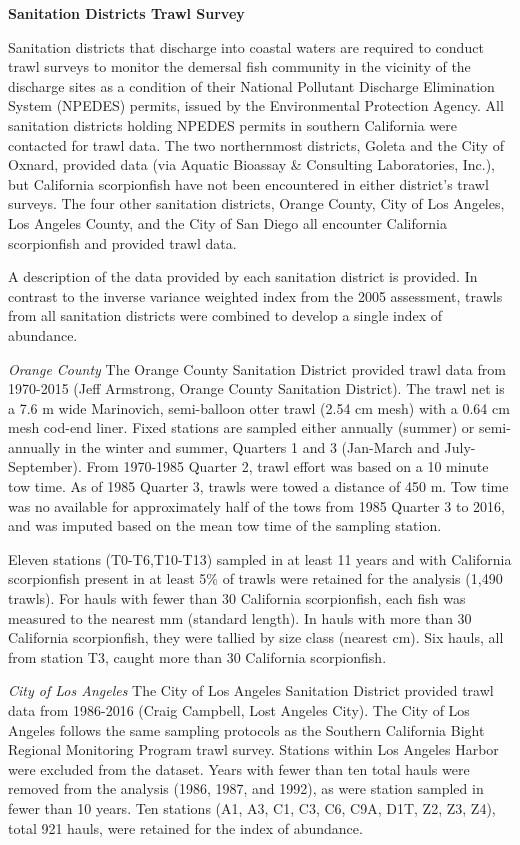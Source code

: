 \documentclass[12pt,]{article}
\begin{document}
\textbf{Sanitation Districts Trawl Survey}

Sanitation districts that discharge into coastal waters are required to
conduct trawl surveys to monitor the demersal fish community in the
vicinity of the discharge sites as a condition of their National
Pollutant Discharge Elimination System (NPEDES) permits, issued by the
Environmental Protection Agency. All sanitation districts holding NPEDES
permits in southern California were contacted for trawl data. The two
northernmost districts, Goleta and the City of Oxnard, provided data
(via Aquatic Bioassay \& Consulting Laboratories, Inc.), but California
scorpionfish have not been encountered in either district's trawl
surveys. The four other sanitation districts, Orange County, City of Los
Angeles, Los Angeles County, and the City of San Diego all encounter
California scorpionfish and provided trawl data.

A description of the data provided by each sanitation district is
provided. In contrast to the inverse variance weighted index from the
2005 assessment, trawls from all sanitation districts were combined to
develop a single index of abundance.

\emph{Orange County} The Orange County Sanitation District provided
trawl data from 1970-2015 (Jeff Armstrong, Orange County Sanitation
District). The trawl net is a 7.6 m wide Marinovich, semi-balloon otter
trawl (2.54 cm mesh) with a 0.64 cm mesh cod-end liner. Fixed stations
are sampled either annually (summer) or semi-annually in the winter and
summer, Quarters 1 and 3 (Jan-March and July-September). From 1970-1985
Quarter 2, trawl effort was based on a 10 minute tow time. As of 1985
Quarter 3, trawls were towed a distance of 450 m. Tow time was no
available for approximately half of the tows from 1985 Quarter 3 to
2016, and was imputed based on the mean tow time of the sampling
station.

Eleven stations (T0-T6,T10-T13) sampled in at least 11 years and with
California scorpionfish present in at least 5\% of trawls were retained
for the analysis (1,490 trawls). For hauls with fewer than 30 California
scorpionfish, each fish was measured to the nearest mm (standard
length). In hauls with more than 30 California scorpionfish, they were
tallied by size class (nearest cm). Six hauls, all from station T3,
caught more than 30 California scorpionfish.

\emph{City of Los Angeles} The City of Los Angeles Sanitation District
provided trawl data from 1986-2016 (Craig Campbell, Lost Angeles City).
The City of Los Angeles follows the same sampling protocols as the
Southern California Bight Regional Monitoring Program trawl survey.
Stations within Los Angeles Harbor were excluded from the dataset. Years
with fewer than ten total hauls were removed from the analysis (1986,
1987, and 1992), as were station sampled in fewer than 10 years. Ten
stations (A1, A3, C1, C3, C6, C9A, D1T, Z2, Z3, Z4), total 921 hauls,
were retained for the index of abundance.
\end{document}
